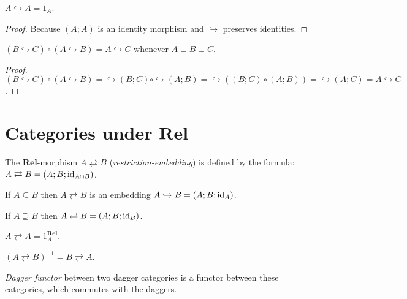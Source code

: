 \begin{prop}
  $A \hookrightarrow A = 1_A$.
\end{prop}

\begin{proof}
  Because $(A ; A)$ is an identity morphism and $\hookrightarrow$ preserves
  identities.
\end{proof}

\begin{prop}
  $(B \hookrightarrow C) \circ (A \hookrightarrow B) = A \hookrightarrow C$
  whenever $A \sqsubseteq B \sqsubseteq C$.
\end{prop}

\begin{proof}
  $(B \hookrightarrow C) \circ (A \hookrightarrow B) = \hookrightarrow (B ; C)
  \circ \hookrightarrow (A ; B) = \hookrightarrow ((B ; C) \circ (A ; B)) =
  \hookrightarrow (A ; C) = A \hookrightarrow C$.
\end{proof}

\section{\texorpdfstring{Categories under $\mathbf{Rel}$}{Categories under Rel}}

\begin{defn}
  The $\mathbf{Rel}$-morphism $A \rightleftarrows B$
  (\emph{restriction-embedding}) is defined by the formula: $A
  \rightleftarrows B = (A ; B ; \operatorname{id}_{A \cap B})$.
\end{defn}

\begin{obvious}
If $A \subseteq B$ then $A \rightleftarrows B$ is an embedding $A \hookrightarrow B
= (A ; B ; \operatorname{id}_A)$.
\end{obvious}

\begin{obvious}
If $A \supseteq B$ then $A \rightleftarrows B = (A ; B ;
\operatorname{id}_B)$.
\end{obvious}

\begin{obvious}
$A \rightleftarrows A = 1^{\mathbf{Rel}}_A$.
\end{obvious}

\begin{obvious}
$(A \rightleftarrows B)^{- 1} = B \rightleftarrows A$.
\end{obvious}

\begin{defn}
\emph{Dagger functor} between two dagger categories is a functor between
these categories, which commutes with the daggers.
\end{defn}

